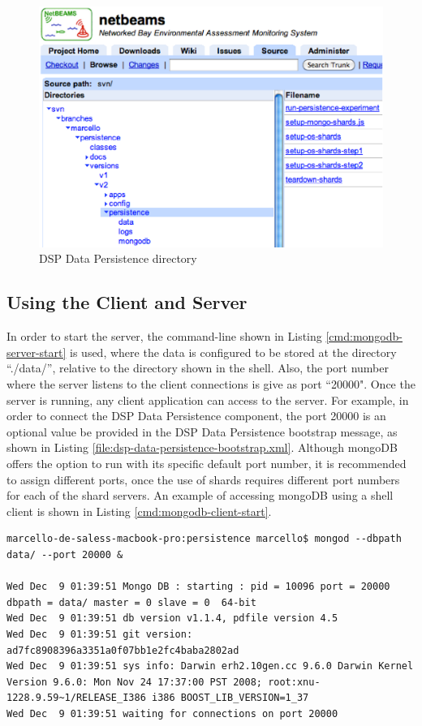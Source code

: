 \begin{figure}[!h]
  \centering
  \includegraphics[scale=0.65]{../diagrams/dsp-persistence-system-dir}
  \caption{DSP Data Persistence directory}
  \label{fig:dsp-persistence-system-dir}
\end{figure}

\subsection{Using the Client and Server}

In order to start the server, the command-line shown in Listing
\ref{cmd:mongodb-server-start} is used, where the data is configured to be
stored at the directory  ``./data/'', relative to the directory shown in the
shell. Also, the port number where the server listens to the client
connections is give as port ``20000". Once the server is running, any client
application can access to the server. For example, in order to connect the DSP
Data Persistence component, the port 20000 is an optional value be provided in
the DSP Data Persistence bootstrap message, as shown in Listing
\ref{file:dsp-data-persistence-bootstrap.xml}. Although mongoDB offers the
option to run with its specific default port number, it is recommended to
assign different ports, once the use of shards requires different port numbers
for each of the shard servers. An example of accessing mongoDB using a shell
client is shown in Listing \ref{cmd:mongodb-client-start}.

\lstset{label=cmd:mongodb-server-start,caption=Starting the Server}
\begin{lstlisting}
marcello-de-saless-macbook-pro:persistence marcello$ mongod --dbpath data/ --port 20000 &

Wed Dec  9 01:39:51 Mongo DB : starting : pid = 10096 port = 20000 dbpath = data/ master = 0 slave = 0  64-bit 
Wed Dec  9 01:39:51 db version v1.1.4, pdfile version 4.5
Wed Dec  9 01:39:51 git version: ad7fc8908396a3351a0f07bb1e2fc4baba2802ad
Wed Dec  9 01:39:51 sys info: Darwin erh2.10gen.cc 9.6.0 Darwin Kernel Version 9.6.0: Mon Nov 24 17:37:00 PST 2008; root:xnu-1228.9.59~1/RELEASE_I386 i386 BOOST_LIB_VERSION=1_37
Wed Dec  9 01:39:51 waiting for connections on port 20000
\end{lstlisting}


